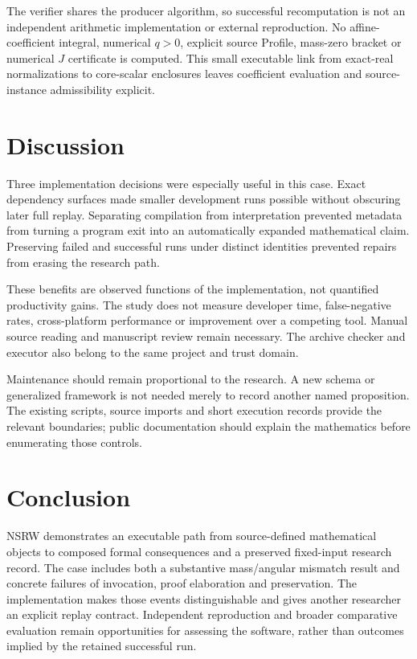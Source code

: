 \documentclass[11pt,a4paper]{article}
\begin{document}
The verifier shares the producer algorithm, so successful recomputation is not an independent arithmetic implementation or external reproduction. No affine-coefficient integral, numerical $q>0$, explicit source Profile, mass-zero bracket or numerical $J$ certificate is computed. This small executable link from exact-real normalizations to core-scalar enclosures leaves coefficient evaluation and source-instance admissibility explicit.

\section{Discussion}

Three implementation decisions were especially useful in this case. Exact dependency surfaces made smaller development runs possible without obscuring later full replay. Separating compilation from interpretation prevented metadata from turning a program exit into an automatically expanded mathematical claim. Preserving failed and successful runs under distinct identities prevented repairs from erasing the research path.

These benefits are observed functions of the implementation, not quantified productivity gains. The study does not measure developer time, false-negative rates, cross-platform performance or improvement over a competing tool. Manual source reading and manuscript review remain necessary. The archive checker and executor also belong to the same project and trust domain.

Maintenance should remain proportional to the research. A new schema or generalized framework is not needed merely to record another named proposition. The existing scripts, source imports and short execution records provide the relevant boundaries; public documentation should explain the mathematics before enumerating those controls.

\section{Conclusion}

NSRW demonstrates an executable path from source-defined mathematical objects to composed formal consequences and a preserved fixed-input research record. The case includes both a substantive mass/angular mismatch result and concrete failures of invocation, proof elaboration and preservation. The implementation makes those events distinguishable and gives another researcher an explicit replay contract. Independent reproduction and broader comparative evaluation remain opportunities for assessing the software, rather than outcomes implied by the retained successful run.
\end{document}
